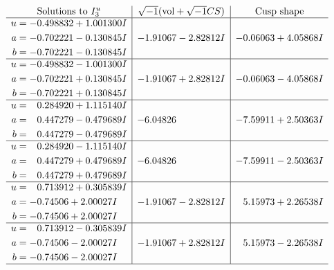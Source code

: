 \documentclass[1p]{elsarticle_modified}
\theoremstyle{definition}
\newcommand{\I}{\sqrt{-1}}
\begin{document}
$$\begin{array}{c|c|c}  
\text{Solutions to }I^u_{3}& \I (\text{vol} + \sqrt{-1}CS) & \text{Cusp shape}\\
 \hline 
\begin{aligned}
u &= -0.498832 + 1.001300 I \\
a &= -0.702221 - 0.130845 I \\
b &= -0.702221 - 0.130845 I\end{aligned}
 & -1.91067 - 2.82812 I & -0.06063 + 4.05868 I \\ \hline\begin{aligned}
u &= -0.498832 - 1.001300 I \\
a &= -0.702221 + 0.130845 I \\
b &= -0.702221 + 0.130845 I\end{aligned}
 & -1.91067 + 2.82812 I & -0.06063 - 4.05868 I \\ \hline\begin{aligned}
u &= \phantom{-}0.284920 + 1.115140 I \\
a &= \phantom{-}0.447279 - 0.479689 I \\
b &= \phantom{-}0.447279 - 0.479689 I\end{aligned}
 & -6.04826\phantom{ +0.000000I} & -7.59911 + 2.50363 I \\ \hline\begin{aligned}
u &= \phantom{-}0.284920 - 1.115140 I \\
a &= \phantom{-}0.447279 + 0.479689 I \\
b &= \phantom{-}0.447279 + 0.479689 I\end{aligned}
 & -6.04826\phantom{ +0.000000I} & -7.59911 - 2.50363 I \\ \hline\begin{aligned}
u &= \phantom{-}0.713912 + 0.305839 I \\
a &= -0.74506 + 2.00027 I \\
b &= -0.74506 + 2.00027 I\end{aligned}
 & -1.91067 - 2.82812 I & \phantom{-}5.15973 + 2.26538 I \\ \hline\begin{aligned}
u &= \phantom{-}0.713912 - 0.305839 I \\
a &= -0.74506 - 2.00027 I \\
b &= -0.74506 - 2.00027 I\end{aligned}
 & -1.91067 + 2.82812 I & \phantom{-}5.15973 - 2.26538 I\\
 \hline 
 \end{array}$$\newpage\newpage\renewcommand{\arraystretch}{1}
\end{document}
